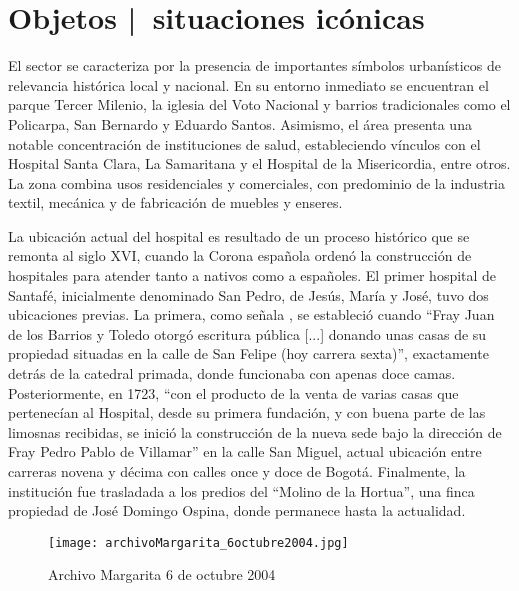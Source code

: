\clearpage
\section{Objetos | situaciones icónicas}

El sector se caracteriza por la presencia de importantes símbolos urbanísticos de relevancia histórica local y nacional. En su entorno inmediato se encuentran el parque Tercer Milenio, la iglesia del Voto Nacional y barrios tradicionales como el Policarpa, San Bernardo y Eduardo Santos. Asimismo, el área presenta una notable concentración de instituciones de salud, estableciendo vínculos con el Hospital Santa Clara, La Samaritana y el Hospital de la Misericordia, entre otros. La zona combina usos residenciales y comerciales, con predominio de la industria textil, mecánica y de fabricación de muebles y enseres.

La ubicación actual del hospital es resultado de un proceso histórico que se remonta al siglo XVI, cuando la Corona española ordenó la construcción de hospitales para atender tanto a nativos como a españoles. El primer hospital de Santafé, inicialmente denominado San Pedro, de Jesús, María y José, tuvo dos ubicaciones previas. La primera, como señala \parencite{Romero1994}, se estableció cuando \enquote{Fray Juan de los Barrios y Toledo otorgó escritura pública [...] donando unas casas de su propiedad situadas en la calle de San Felipe (hoy carrera sexta)}, exactamente detrás de la catedral primada, donde funcionaba con apenas doce camas. Posteriormente, en 1723, \enquote{con el producto de la venta de varias casas que pertenecían al Hospital, desde su primera fundación, y con buena parte de las limosnas recibidas, se inició la construcción de la nueva sede bajo la dirección de Fray Pedro Pablo de Villamar} en la calle San Miguel, actual ubicación entre carreras novena y décima con calles once y doce de Bogotá. Finalmente, la institución fue trasladada a los predios del \enquote{Molino de la Hortua}, una finca propiedad de José Domingo Ospina, donde permanece hasta la actualidad.


\clearpage
\begin{figure}[h!]
    \centering
    \texttt{[image: archivoMargarita\_6octubre2004.jpg]}
    \caption{Archivo Margarita 6 de octubre 2004}
    \label{fig:archivoMargarita_6octubre2004}
\end{figure}

